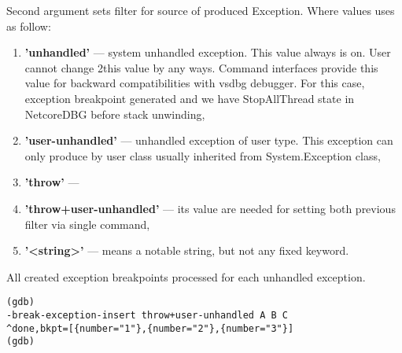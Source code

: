 \documentclass[a4paper,12pt]{article}
\newenvironment{nobr}{\begin{minipage}{\textwidth}\setlength\parskip{1em}
}{\end{minipage}\ignorespacesafterend}
\begin{document}
Second argument sets filter for source of produced Exception. Where values uses as follow:
\begin{enumerate}
 \item \textbf{'unhandled'} --- system unhandled exception. This value always is on. User cannot change 2this value by any ways. Command interfaces provide this value for backward compatibilities with vsdbg debugger. For this case, exception breakpoint generated and we have StopAllThread state in NetcoreDBG before stack unwinding,
 \item \textbf{'user-unhandled'} --- unhandled exception of user type. This exception can only produce by user class usually inherited from System.Exception class,
 \item \textbf{'throw'} --- 
 \item \textbf{'throw+user-unhandled'} --- its value are needed for setting both previous filter via single command,
 \item \textbf{'<string>'} --- means a notable string, but not any fixed keyword.
\end{enumerate}


All created exception breakpoints processed for each unhandled exception.

\begin{nobr}
\begin{lstlisting}[style=cplusplus,title=\lstinline|Example|,numbers=none]
(gdb)
-break-exception-insert throw+user-unhandled A B C
^done,bkpt=[{number="1"},{number="2"},{number="3"}]
(gdb)
\end{lstlisting}
\end{nobr}
\end{document}
